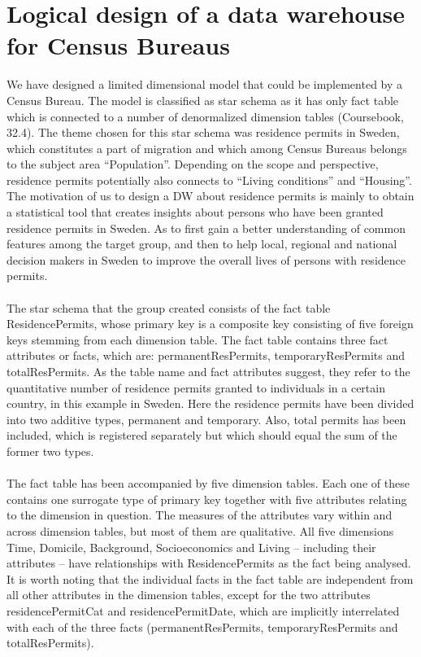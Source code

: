 \section{Logical design of a data warehouse for Census Bureaus}
We have designed a limited dimensional model that could be implemented by a Census Bureau. The model is classified as star schema as it has only fact table which is connected to a number of denormalized dimension tables (Coursebook, 32.4). The theme chosen for this star schema was residence permits in Sweden, which constitutes a part of migration and which among Census Bureaus belongs to the subject area “Population”. Depending on the scope and perspective, residence permits potentially also connects to “Living conditions” and “Housing”. The motivation of us to design a DW about residence permits is mainly to obtain a statistical tool that creates insights about persons who have been granted residence permits in Sweden. As to first gain a better understanding of common features among the target group, and then to help local, regional and national decision makers in Sweden to improve the overall lives of persons with residence permits. 
\\\\
The star schema that the group created consists of the fact table ResidencePermits, whose primary key is a composite key consisting of five foreign keys stemming from each dimension table. The fact table contains three fact attributes or facts, which are: permanentResPermits, temporaryResPermits and totalResPermits. As the table name and fact attributes suggest, they refer to the quantitative number of residence permits granted to individuals in a certain country, in this example in Sweden. Here the residence permits have been divided into two additive types, permanent and temporary. Also, total permits has been included, which is registered separately but which should equal the sum of the former two types. 
\\\\
The fact table has been accompanied by five dimension tables. Each one of these contains one surrogate type of primary key together with five attributes relating to the dimension in question. The measures of the attributes vary within and across dimension tables, but most of them are qualitative. All five dimensions Time, Domicile, Background, Socioeconomics and Living – including their attributes – have relationships with ResidencePermits as the fact being analysed. It is worth noting that the individual facts in the fact table are independent from all other attributes in the dimension tables, except for the two attributes residencePermitCat and residencePermitDate, which are implicitly interrelated with each of the three facts (permanentResPermits, temporaryResPermits and totalResPermits). 
\newpage
